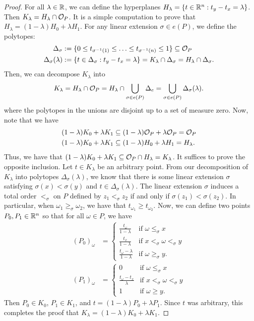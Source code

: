 \documentclass{puthesis-UG}
\begin{document}
\begin{proof}
	For all $\lambda \in \mathbb{R}$, we can define the hyperplanes $H_\lambda = \{t \in \mathbb{R}^n : t_y - t_x = \lambda\}$. Then $K_\lambda = H_\lambda \cap \mathcal{O}_P$. It is a simple computation to prove that $H_\lambda = (1-\lambda) H_0 + \lambda H_1$. For any linear extension $\sigma \in e(P)$, we define the polytopes:
	\begin{align*}
		\Delta_\sigma & := \{0 \leq t_{\sigma^{-1}(1)} \leq \ldots \leq t_{\sigma^{-1}(n)} \leq 1\} \subseteq \mathcal{O}_P \\
		\Delta_\sigma (\lambda) & := \{t \in \Delta_\sigma: t_y - t_x = \lambda\} = K_\lambda \cap \Delta_\sigma = H_\lambda \cap \Delta_\sigma.
	\end{align*}
	Then, we can decompose $K_\lambda$ into 
	\[
		K_\lambda = H_\lambda \cap \mathcal{O}_P = H_\lambda \cap \bigcup_{\sigma \in e(P)} \Delta_e = \bigcup_{\sigma \in e(P)} \Delta_\sigma(\lambda).
	\]
	where the polytopes in the unions are disjoint up to a set of measure zero. Now, note that we have 
	\begin{align*}
		(1-\lambda) K_0 + \lambda K_1 & \subseteq (1-\lambda) \mathcal{O}_P + \lambda \mathcal{O}_P = \mathcal{O}_P \\
		(1-\lambda)K_0 + \lambda K_1 & \subseteq (1-\lambda) H_0 + \lambda H_1 = H_\lambda.
	\end{align*} 
	Thus, we have that $(1-\lambda) K_0 + \lambda K_1 \subseteq \mathcal{O}_P \cap H_\lambda = K_\lambda$. It suffices to prove the opposite inclusion. Let $t \in K_\lambda$ be an arbitrary point. From our decomposition of $K_\lambda$ into polytopes $\Delta_\sigma (\lambda)$, we know that there is some linear extension $\sigma$ satisfying $\sigma(x) < \sigma(y)$ and $t \in \Delta_\sigma (\lambda)$. The linear extension $\sigma$ induces a total order $<_\sigma$ on $P$ defined by $z_1 <_\sigma z_2$ if and only if $\sigma(z_1) < \sigma(z_2)$. In particular, when $\omega_1 \geq_\sigma \omega_2$, we have that $t_{\omega_1} \geq t_{\omega_2}$. Now, we can define two points $P_0, P_1 \in \mathbb{R}^n$ so that for all $\omega \in P$, we have 
	\begin{align*}
		(P_0)_\omega & = \begin{cases}
			\frac{t_\omega}{1-\lambda} & \text{if $\omega \leq_\sigma x$} \\
			\frac{t_x}{1-\lambda} & \text{if $x <_\sigma \omega <_\sigma y$} \\
			\frac{t_\omega - \lambda}{1-\lambda} & \text{if $\omega \geq_\sigma y$}.
		\end{cases} \\
		(P_1)_\omega & = \begin{cases}
			0 & \text{if $\omega \leq_\sigma x$} \\
			\frac{t_\omega - t_x}{\lambda} & \text{if $x <_\sigma \omega <_\sigma y$} \\
			1 & \text{if $\omega \geq y$}.
		\end{cases}
	\end{align*}
	Then $P_0 \in K_0$, $P_1 \in K_1$, and $t = (1-\lambda) P_0 + \lambda P_1$. Since $t$ was arbitrary, this completes the proof that $K_\lambda = (1-\lambda) K_0 + \lambda K_1$.
\end{proof}
\end{document}
